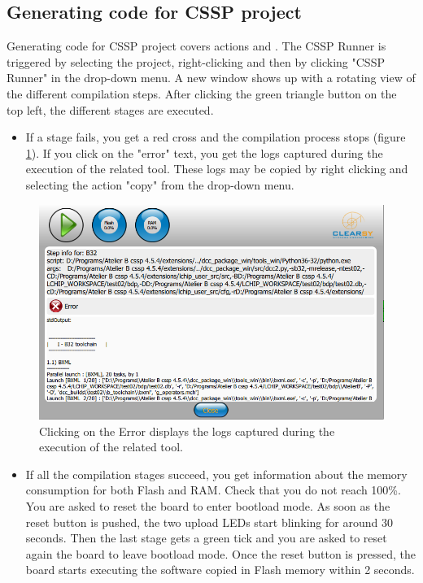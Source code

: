 \subsection{Generating code for CSSP project}

Generating code for CSSP project covers actions  and . The CSSP Runner is triggered by selecting the project, right-clicking and then by clicking "CSSP Runner" in the drop-down menu. A new window shows up with a rotating view of the different compilation steps. After clicking the green triangle button on the top left, the different stages are executed. 
\begin{itemize}
    \item If a stage fails, you get a red cross and the compilation process stops (figure \ref{programming:runner-error}). If you click on the "error" text, you get the logs captured during the execution of the related tool. These logs may be copied by right clicking and selecting the action "copy" from the drop-down menu. 
\end{itemize}    
      \begin{figure}[h]
\centering\includegraphics[scale=0.3]{Pictures/chapterProgramming/runner-error.png}
\caption{Clicking on the Error displays the logs captured during the execution of the related tool.}
\label{programming:runner-error}
\end{figure}  
\begin{itemize}
    \item If all the compilation stages succeed, you get information about the memory consumption for both Flash and RAM. Check that you do not reach 100\%. You are asked to reset the board to enter bootload mode. As soon as the reset button is pushed, the two upload LEDs start blinking for around 30 seconds. Then the last stage gets a green tick and you are asked to reset again the board to leave bootload mode. Once the reset button is pressed, the board starts executing the software copied in Flash memory within 2 seconds.
\end{itemize}
